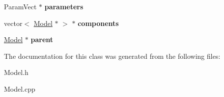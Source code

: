 \begin{DoxyCompactItemize}
\item 
Param\+Vect $\ast$ {\bfseries parameters}\hypertarget{classModel_a6f977294062afde47f4d11b537b877a5}{}\label{classModel_a6f977294062afde47f4d11b537b877a5}

\item 
vector$<$ \hyperlink{classModel}{Model} $\ast$ $>$ $\ast$ {\bfseries components}\hypertarget{classModel_a6dd70d76743fa32ec787769e6905259b}{}\label{classModel_a6dd70d76743fa32ec787769e6905259b}

\item 
\hyperlink{classModel}{Model} $\ast$ {\bfseries parent}\hypertarget{classModel_a1f4bff9a38ebed22eed876a85718dbcf}{}\label{classModel_a1f4bff9a38ebed22eed876a85718dbcf}

\end{DoxyCompactItemize}


The documentation for this class was generated from the following files\+:\begin{DoxyCompactItemize}
\item 
Model.\+h\item 
Model.\+cpp\end{DoxyCompactItemize}
